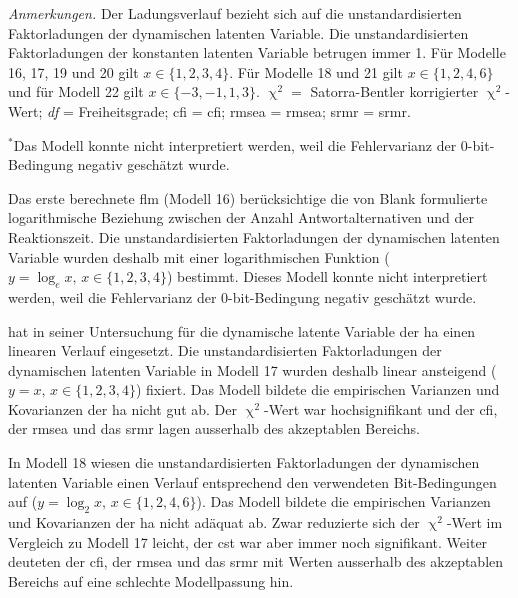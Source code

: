 \documentclass[11pt, twoside, a4paper]{book}		%
\begin{document}
\begin{table}[htb]
\begin{adjustbox}{width=1\textwidth, keepaspectratio}
\begin{threeparttable}
{\begin{tabular}
					
				\end{tabular}%
			}
			\begin{tablenotes}[flushleft]
				\footnotesize				%
				\setlength{}	%
				\item \textit{Anmerkungen.} Der Ladungsverlauf bezieht sich auf die unstandardisierten Faktorladungen der dynamischen latenten Variable. Die unstandardisierten Faktorladungen der konstanten latenten Variable betrugen immer 1. Für Modelle 16, 17, 19 und 20 gilt $x\in\{1,2,3,4\}$. Für Modelle 18 und 21 gilt $x\in\{1,2,4,6\}$ und für Modell 22 gilt $x\in\{-3,-1,1,3\}$. $\upchi^2 =$ Satorra-Bentler \citeyearpar{Satorra1994} korrigierter $\upchi^2$-Wert; \textit{df} = Freiheitsgrade; \gls{cfi} = \acrlong{cfi}; \gls{rmsea} = \acrlong{rmsea}; \gls{srmr} = \acrlong{srmr}.
				\item {$^{*}$}Das Modell konnte nicht interpretiert werden, weil die Fehlervarianz der 0-bit-Bedingung negativ geschätzt wurde.
			\end{tablenotes}%
		\end{threeparttable}
	\end{adjustbox}	
\end{table}

Das erste berechnete \gls{flm} (Modell 16) berücksichtige die von Blank \citep[1934; zitiert nach][S. 11]{Hick1952} formulierte logarithmische Beziehung zwischen der Anzahl Antwortalternativen und der Reaktionszeit. Die unstandardisierten Faktorladungen der dynamischen latenten Variable wurden deshalb mit einer logarithmischen Funktion ($y=\log_{e}x,\,x\in\{1, 2, 3, 4\}$) bestimmt. Dieses Modell konnte nicht interpretiert werden, weil die Fehlervarianz der 0-bit-Bedingung negativ geschätzt wurde.

\citet{Schweizer2006b} hat in seiner Untersuchung für die dynamische latente Variable der \gls{ha} einen linearen Verlauf eingesetzt. 
Die unstandardisierten Faktorladungen der dynamischen latenten Variable in Modell 17 wurden deshalb linear ansteigend ($y=x,\,x\in\{1, 2, 3, 4\}$) fixiert. Das Modell bildete die empirischen Varianzen und Kovarianzen der \gls{ha} nicht gut ab. Der $\upchi^2$-Wert war hochsignifikant und der \gls{cfi}, der \gls{rmsea} und das \gls{srmr} lagen ausserhalb des akzeptablen Bereichs.

In Modell 18 wiesen die unstandardisierten Faktorladungen der dynamischen latenten Variable einen Verlauf entsprechend den verwendeten Bit-Bedingungen auf ($y=\log_{2}x,\,x\in\{1, 2, 4, 6\}$). Das Modell bildete die empirischen Varianzen und Kovarianzen der \gls{ha} nicht adäquat ab. Zwar reduzierte sich der $\upchi^2$-Wert im Vergleich zu Modell 17 leicht, der \gls{cst} war aber immer noch signifikant. Weiter deuteten der \gls{cfi}, der \gls{rmsea} und das \gls{srmr} mit Werten ausserhalb des akzeptablen Bereichs auf eine schlechte Modellpassung hin.
\end{document}
